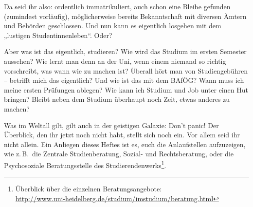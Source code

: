 \label{dschungel}
Da seid ihr also: ordentlich immatrikuliert, auch schon eine Bleibe gefunden (zumindest vorläufig), möglicherweise bereits Bekanntschaft mit diversen Ämtern und Behörden geschlossen. Und nun kann es eigentlich losgehen mit dem „lustigen Studentinnenleben“. Oder?

Aber was ist das eigentlich, studieren? Wie wird das Studium im ersten Semester aussehen? Wie lernt man denn an der Uni, wenn einem niemand so richtig vorschreibt, was wann wie zu machen ist? Überall hört man von Studiengebühren -- betrifft mich das eigentlich? Und wie ist das mit dem BAfÖG? Wann muss ich meine ersten Prüfungen ablegen? Wie kann ich Studium und Job unter einen Hut bringen? Bleibt neben dem Studium überhaupt noch Zeit, etwas anderes zu machen?

Was im Weltall gilt, gilt auch in der geistigen Galaxie: Don't panic! Der Überblick, den ihr jetzt noch nicht habt, stellt sich noch ein. Vor allem seid ihr nicht allein. Ein Anliegen dieses Heftes ist es, euch die Anlaufstellen aufzuzeigen, wie z.\,B.\ die Zentrale Studienberatung, Sozial- und Rechtsberatung, oder die Psychosoziale Beratungsstelle des Studierendenwerks\footnote{Überblick über die einzelnen Beratungsangebote:\\\url{http://www.uni-heidelberg.de/studium/imstudium/beratung.html}}.


